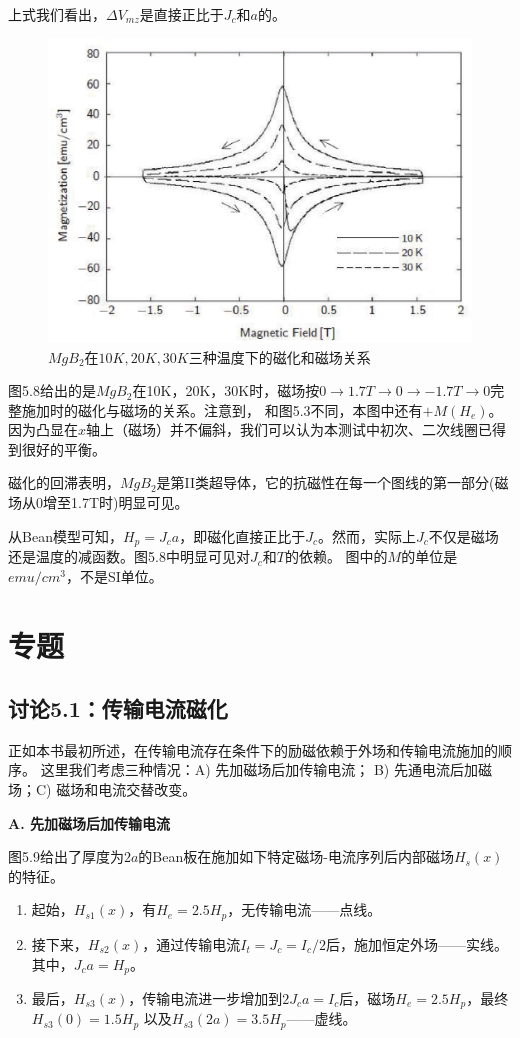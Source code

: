 上式我们看出，$\Delta V_{mz}$是直接正比于$J_c$和$a$的。
\begin{figure}[htbp]
  \centering
 \includegraphics[scale=0.7]{chpt5/figs/fig5.8.eps}
  \caption{$MgB_2$在$10K,20K,30K$三种温度下的磁化和磁场关系}\label{fig:magvfield}
\end{figure}
图5.8给出的是$MgB_2$在10K，20K，30K时，磁场按$0\rightarrow 1.7T\rightarrow 0 \rightarrow -1.7T\rightarrow 0$完整施加时的磁化与磁场的关系。注意到，
和图5.3不同，本图中还有$+M(H_e)$。因为凸显在$x$轴上（磁场）并不偏斜，我们可以认为本测试中初次、二次线圈已得到很好的平衡。

磁化的回滞表明，$MgB_2$是第II类超导体，它的抗磁性在每一个图线的第一部分(磁场从0增至1.7T时)明显可见。

从Bean模型可知，$H_p=J_c a$，即磁化直接正比于$J_c$。然而，实际上$J_c$不仅是磁场还是温度的减函数。图5.8中明显可见对$J_c$和$T$的依赖。
图中的$M$的单位是$emu/cm^3$，不是SI单位。

\section{专题}
\subsection{讨论5.1：传输电流磁化}
正如本书最初所述，在传输电流存在条件下的励磁依赖于外场和传输电流施加的顺序。
这里我们考虑三种情况：A) 先加磁场后加传输电流； B) 先通电流后加磁场；C) 磁场和电流交替改变。

\textbf{A.  先加磁场后加传输电流}

图5.9给出了厚度为$2a$的Bean板在施加如下特定磁场-电流序列后内部磁场$H_s(x)$的特征。
\begin{enumerate}
	\item 起始，$H_{s1}(x)$，有$H_e=2.5H_p$，无传输电流——点线。
	\item 接下来，$H_{s2}(x)$，通过传输电流$I_t=J_c=I_c/2$后，施加恒定外场——实线。其中，$J_c a=H_p$。
	\item 最后，$H_{s3}(x)$，传输电流进一步增加到$2J_c a=I_c$后，磁场$H_e =2.5 H_p$，最终$H_{s3}(0)=1.5 H_p$
	以及$H_{s3}(2a)=3.5H_p$——虚线。
\end{enumerate}

